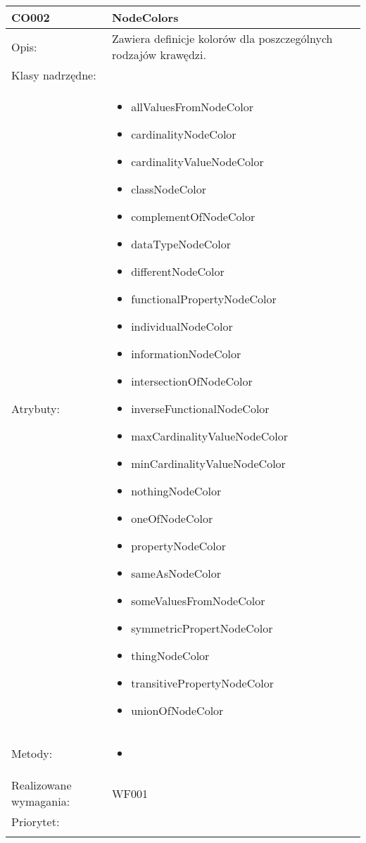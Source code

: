 \documentclass[a4paper,10pt]{article}
\begin{document}
\begin{center}
\begin{tabular}{|m{3cm}|m{9cm}|}
CO002 & NodeColors \\ \hline
Opis: & Zawiera definicje kolorów dla poszczególnych rodzajów krawędzi.   \\ \hline
Klasy nadrzędne: &     \\ \hline
Atrybuty: & \begin{itemize}
 \item allValuesFromNodeColor
 \item cardinalityNodeColor
 \item cardinalityValueNodeColor
 \item classNodeColor
 \item complementOfNodeColor
 \item dataTypeNodeColor
 \item differentNodeColor
 \item functionalPropertyNodeColor
 \item individualNodeColor
 \item informationNodeColor
 \item intersectionOfNodeColor
 \item inverseFunctionalNodeColor
 \item maxCardinalityValueNodeColor
 \item minCardinalityValueNodeColor
 \item nothingNodeColor
 \item oneOfNodeColor
 \item propertyNodeColor
 \item sameAsNodeColor
 \item someValuesFromNodeColor
 \item symmetricPropertNodeColor
 \item thingNodeColor
 \item transitivePropertyNodeColor
 \item unionOfNodeColor 
\end{itemize}
 \\ \hline
Metody: & \begin{itemize}
 \item 
\end{itemize}
  \\ \hline
Realizowane wymagania: & WF001 \\ \hline
Priorytet: &  \\ \hline

\multicolumn{2}{c}{} \\
 \hline

\end{tabular}


\end{center}
\end{document}
